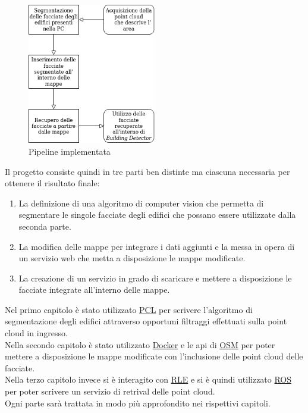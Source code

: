 \begin{figure}[H]
    \centering
    \includegraphics[width=0.5\textwidth]{Immagini/Pipeline.png}
    \caption{Pipeline implementata}
    \label{fig:Pipeline}
\end{figure}

Il progetto consiste quindi in tre parti ben distinte ma ciascuna necessaria per ottenere il risultato finale:
\begin{enumerate}
    \item La definizione di una algoritmo di computer vision che permetta di segmentare le singole facciate degli edifici che possano essere utilizzate dalla seconda parte.
    \item La modifica delle mappe per integrare i dati aggiunti e la messa in opera di un servizio web che metta a disposizione le mappe modificate.
    \item La creazione di un servizio in grado di scaricare e mettere a disposizione le facciate integrate all'interno delle mappe.
\end{enumerate}{}
Nel primo capitolo è stato utilizzato \hyperref[sez:PCL]{PCL} per scrivere l'algoritmo di segmentazione degli edifici attraverso opportuni filtraggi effettuati sulla point cloud in ingresso.\\

Nella secondo capitolo è stato utilizzato \hyperref[sez:Docker]{Docker} e le api di \hyperref[sez:OSM]{OSM} per poter mettere a disposizione le mappe modificate con l'inclusione delle point cloud delle facciate.\\

Nella terzo capitolo invece si è interagito con \hyperref[sez:RLE]{RLE} e si è quindi utilizzato \hyperref[sez:ROS]{ROS} per poter scrivere un servizio di retrival delle point cloud.\\ 
Ogni parte sarà trattata in modo più approfondito nei rispettivi capitoli.

